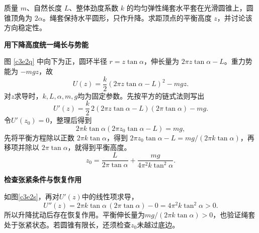 \begin{question}
\begin{example}[圆锥上的弹性绳套]
质量 $m$、自然长度 $L$、整体劲度系数 $k$ 的均匀弹性绳套水平套在光滑圆锥上，圆锥顶角为 $2\alpha$。绳套保持水平圆形，只作升降。求距顶点的平衡高度 $z$，并讨论该方向稳定性。
\end{example}
\end{question}
\begin{solution}\textbf{用下降高度统一绳长与势能}\par\nobreak
图 \ref{c3e2q} 中向下为正，圆环半径 $r=z\tan\alpha$，伸长量为 $2\pi z\tan\alpha-L$。重力势能为 $-mgz$，故
\[
 U(z)=\frac k2(2\pi z\tan\alpha-L)^2-mgz.
\]
对$z$求导时，$k,L,\alpha,m,g$均为固定参数。先按平方的链式法则写出
\[
U'(z)=\frac k2\,2(2\pi z\tan\alpha-L)(2\pi\tan\alpha)-mg.
\]
令$U'(z_0)=0$，整理后得到
\[
 2\pi k\tan\alpha(2\pi z_0\tan\alpha-L)=mg,
\]
先将平衡方程除以正数 $2\pi k\tan\alpha$，得到
$2\pi z_0\tan\alpha-L=mg/(2\pi k\tan\alpha)$，再移项并除以 $2\pi\tan\alpha$，就得到平衡高度。
\[
 \boxed{z_0=\frac{L}{2\pi\tan\alpha}
 +\frac{mg}{4\pi^2k\tan^2\alpha}}.
\]



\par\medskip{}\noindent\textbf{检查张紧条件与恢复作用}\par\nobreak
如图\ref{c3e2s}，再对$U'(z)$中的线性项求导，
\[
U''(z)=2\pi k\tan\alpha\,(2\pi\tan\alpha)-0
=4\pi^2k\tan^2\alpha>0.
\]
所以升降扰动后存在恢复作用。平衡伸长量为$mg/(2\pi k\tan\alpha)>0$，也验证绳套处于张紧状态。若圆锥有限长，还须检查$z_0$未越过底边。



\end{solution}
